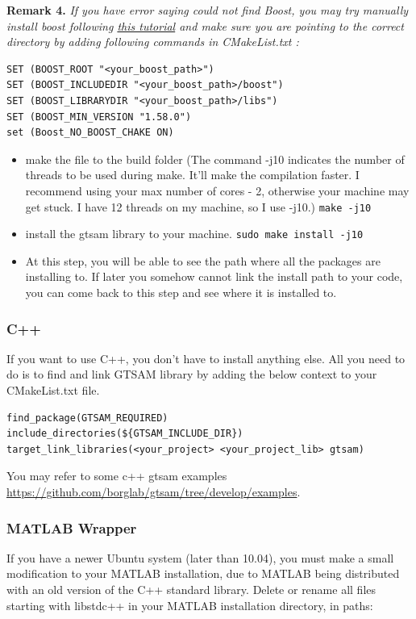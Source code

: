 \documentclass[tp]{lcc}
\begin{document}
\textbf{Remark 4.} \textit{If you have error saying could not find Boost, you may try manually install boost following \href{https://www.boost.org/doc/libs/1_66_0/more/getting_started/unix-variants.html\#get-boost}{this tutorial} and make sure you are pointing to the correct directory by adding following commands in CMakeList.txt :}



\begin{lstlisting}[style=bash]
SET (BOOST_ROOT "<your_boost_path>")
SET (BOOST_INCLUDEDIR "<your_boost_path>/boost")
SET (BOOST_LIBRARYDIR "<your_boost_path>/libs")
SET (BOOST_MIN_VERSION "1.58.0")
set (Boost_NO_BOOST_CHAKE ON)
\end{lstlisting}

\begin{itemize}
    \item make the file to the build folder (The command -j10 indicates the number of threads to be used during make. It'll make the compilation faster. I recommend using your max number of cores - 2, otherwise your machine may get stuck. I have 12 threads on my machine, so I use -j10.) \lstinline[style=bash]{make -j10}
    \item install the gtsam library to your machine. \lstinline[style=bash]{sudo make install -j10}
    \item At this step, you will be able to see the path where all the packages are installing to. If later you somehow cannot link the install path to your code, you can come back to this step and see where it is installed to.
\end{itemize}

\subsubsection*{C++}
If you want to use C++, you don't have to install anything else. All you need to do is to find and link GTSAM library by adding the below context to your CMakeList.txt file.

\begin{lstlisting}[style=cmake]
find_package(GTSAM_REQUIRED)
include_directories(${GTSAM_INCLUDE_DIR})
target_link_libraries(<your_project> <your_project_lib> gtsam)
\end{lstlisting}

You may refer to some c++ gtsam examples \url{https://github.com/borglab/gtsam/tree/develop/examples}.

\subsubsection*{MATLAB Wrapper}
If you have a newer Ubuntu system (later than 10.04), you must make a small modification to your MATLAB installation, due to MATLAB being distributed with an old version of the C++ standard library. Delete or rename all files starting with libstdc++ in your MATLAB installation directory, in paths:
\end{document}
